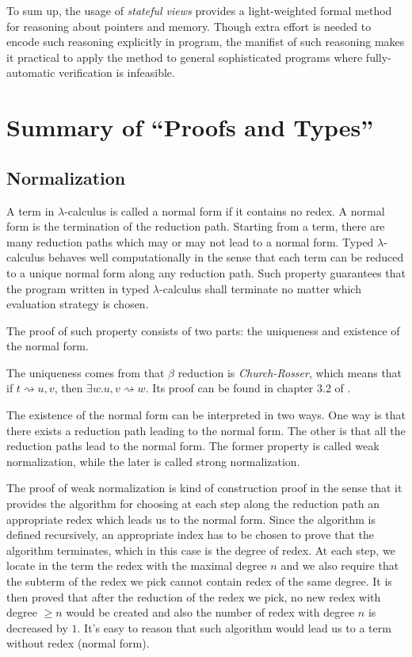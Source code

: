 \documentclass{llncs}
\begin{document}
To sum up, the usage of \emph{stateful views} provides a light-weighted formal
method for reasoning about pointers and memory. Though extra effort is
needed to encode such reasoning explicitly in program, the manifist of such
reasoning makes it practical to apply the method to general sophisticated programs where
fully-automatic verification is infeasible.



\newpage
\section{Summary of ``Proofs and Types''
  \cite{Girard1989Proofs}}
  \label{section:proofstypes}

\subsection{Normalization}
A term in $\lambda$-calculus is called a normal form if it contains no redex. A
normal form is the termination of the reduction path. Starting from a term,
there are many reduction paths which may or may not lead to a normal form.
Typed $\lambda$-calculus behaves well computationally in the sense that each
term can be reduced to a unique normal form along any reduction path. Such property
guarantees that the program written in typed $\lambda$-calculus shall terminate
no matter which evaluation strategy is chosen.

The proof of such property consists of two parts: the uniqueness and existence of 
the normal form.

The uniqueness comes from that $\beta$ reduction is \emph{Church-Rosser},
which means that if $t \rightsquigarrow u, v$, then $\exists w. u, v
\rightsquigarrow w$. Its proof can be found in chapter 3.2 of
\cite{Barendregt1984Lambda}.

The existence of the normal form can be interpreted in two ways. One way
is that there exists a reduction path leading to the normal form. The other is
that all the reduction paths lead to the normal form. The former property is
called weak normalization, while the later is called strong normalization.

The proof of weak normalization is kind of construction proof in the sense that
it provides the algorithm for choosing at each step along the reduction path
an appropriate redex which leads us to the normal form. Since the algorithm is
defined recursively, an appropriate index has to be chosen to prove that the
algorithm terminates, which in this case is the degree of redex. At each step,
we locate in the term the redex with the maximal degree $n$ and we also require that
the subterm of the redex we pick cannot contain redex of the same degree. It
is then proved that after the reduction of the redex we pick, no new redex with
degree $\ge n$ would be created and also the number of redex with degree $n$ is
decreased by $1$. It's easy to reason that such algorithm would lead us to a
term without redex (normal form).
\end{document}
